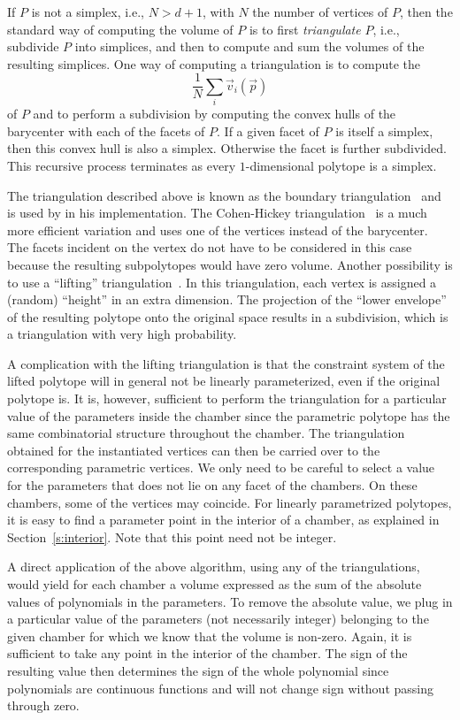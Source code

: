 If $P$ is not a simplex, i.e., $N > d+1$, with $N$ the number of
vertices of $P$, then the standard way of computing the volume of $P$
is to first {\em triangulate} $P$, i.e., subdivide $P$ into simplices,
and then to compute and sum the volumes of the resulting simplices.
One way of computing a triangulation is to
compute the 
$$
\frac 1 N \sum_i \vec v_i(\vec p)
$$
of $P$
and to perform a subdivision by computing the convex hulls
of the barycenter with each of the facets of $P$.
If a given facet of $P$ is itself a simplex, then this convex hull
is also a simplex.  Otherwise the facet is further subdivided.
This recursive process terminates as every $1$-dimensional polytope
is a simplex.

The triangulation described above is known as
the boundary triangulation~ and is used
by  in his implementation.
The Cohen-Hickey triangulation~
is a much more efficient variation and uses one of the vertices
instead of the barycenter.  The facets incident on the vertex
do not have to be considered in this case because the resulting subpolytopes
would have zero volume.
Another possibility is to use a
``lifting'' triangulation~.
In this triangulation, each vertex is assigned a (random) ``height'' in
an extra dimension.
The projection of the ``lower envelope'' of the resulting polytope onto
the original space results in a subdivision, which is a triangulation
with very high probability.

A complication with the lifting triangulation is that the constraint system
of the lifted polytope will in general not be linearly parameterized,
even if the original polytope is.
It is, however, sufficient to perform the triangulation for a particular
value of the parameters inside the chamber since the parametric polytope
has the same combinatorial structure throughout the chamber.
The triangulation obtained for the instantiated vertices can then
be carried over to the corresponding parametric vertices.
We only need to be careful to select a value for the parameters that
does not lie on any facet of the chambers.  On these chambers, some
of the vertices may coincide.
For linearly parametrized polytopes, it is easy to find a parameter
point in the interior of a chamber, as explained in Section~\ref{s:interior}.
Note that this point need not be integer.

A direct application of the above algorithm, using any of the triangulations,
would yield for each chamber
a volume expressed as the sum of the absolute values of polynomials in
the parameters.  To remove the absolute value, we plug in a particular
value of the parameters (not necessarily integer)
belonging to the given chamber for which we know that the volume is non-zero.
Again, it is sufficient to take any point in the interior of the chamber.
The sign of the resulting value then determines the sign of the whole
polynomial since polynomials are continuous functions and will not change
sign without passing through zero.

